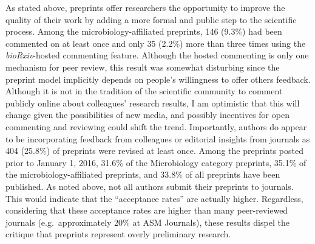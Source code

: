 \documentclass[11pt,]{article}
\begin{document}
As stated above, preprints offer researchers the opportunity to improve
the quality of their work by adding a more formal and public step to the
scientific process. Among the microbiology-affiliated preprints, 146
(9.3\%) had been commented on at least once and only 35 (2.2\%) more
than three times using the \emph{bioRxiv}-hosted commenting feature.
Although the hosted commenting is only one mechanism for peer review,
this result was somewhat disturbing since the preprint model implicitly
depends on people's willingness to offer others feedback. Although it is
not in the tradition of the scientific community to comment publicly
online about colleagues' research results, I am optimistic that this
will change given the possibilities of new media, and possibly
incentives for open commenting and reviewing could shift the trend.
Importantly, authors do appear to be incorporating feedback from
colleagues or editorial insights from journals as 404 (25.8\%) of
preprints were revised at least once. Among the preprints posted prior
to January 1, 2016, 31.6\% of the Microbiology category preprints,
35.1\% of the microbiology-affiliated preprints, and 33.8\% of all
preprints have been published. As noted above, not all authors submit
their preprints to journals. This would indicate that the ``acceptance
rates'' are actually higher. Regardless, considering that these
acceptance rates are higher than many peer-reviewed journals
(e.g.~approximately 20\% at ASM Journals), these results dispel the
critique that preprints represent overly preliminary research.
\end{document}
